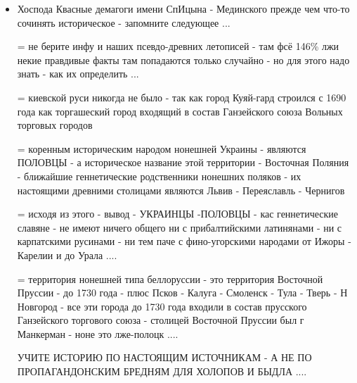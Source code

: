 \begin{itemize}
	\item {}

Хоспода Квасные демагоги имени СпИцына - Мединского прежде чем что-то сочинять
								историческое - запомните следующее ...

= не берите инфу и наших псевдо-древних летописей - там фсё 146\% лжи некие
								правдивые факты там попадаются только случайно - но для этого
								надо знать - как их определить ...

= киевской руси никогда не было - так как город Куяй-гард строился с 1690 года
								как торгашеский город входящий в состав Ганзейского союза
								Вольных торговых городов

= коренным историческим народом нонешней Украины - являются ПОЛОВЦЫ - а
								историческое название этой территории - Восточная Поляния -
								ближайшие геннетические родственники нонешних поляков - их
								настоящими древними столицами являются Львив - Переяславль -
								Чернигов

= исходя из этого - вывод - УКРАИНЦЫ -ПОЛОВЦЫ - кас геннетические славяне - не
								имеют ничего общего ни с прибалтийскими латинянами - ни с
								карпатскими русинами - ни тем паче с фино-угорскими народами от
								Ижоры - Карелии и до Урала ....

= территория нонешней типа беллоруссии - это территория Восточной Пруссии - до
								1730 года - плюс Псков - Калуга - Смоленск - Тула - Тверь - Н
								Новгород - все эти города до 1730 года входили в состав
								прусского Ганзейского торгового союза - столицей Восточной
								Пруссии был г Манкерман - ноне это лже-полоцк ....

УЧИТЕ ИСТОРИЮ ПО НАСТОЯЩИМ ИСТОЧНИКАМ - А НЕ ПО ПРОПАГАНДОНСКИМ БРЕДНЯМ ДЛЯ
								ХОЛОПОВ И БЫДЛА ....
\end{itemize}
